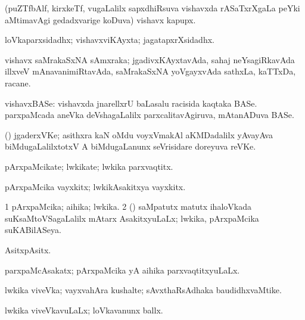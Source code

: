 {{{{{{\begin{center}
\bentry
{} 
\gl{\nA}
\expl{}
\bmng
(puZTfbAlf, kirxkeTf, \mo vugaLalilx sapxdhiRsuva vishavxda rASaTxrXgaLa peYki aMtimavAgi gedadxvarige koDuva) vishavx kapupx. 
\emng
\eentry

\bentry
{} 
\gl{\gu}
\expl{}
\bmng
loVkaparxsidadhx; vishavxviKAyxta; jagatapxrXsidadhx. 
\emng
\eentry

\bentry
{} 
\gl{\nA}
\expl{}
\bmng
vishavx saMrakaSxNA sAmxraka; jgadivxKAyxtavAda, sahaj neYsagiRkavAda illxveV mAnavanimiRtavAda, saMrakaSxNA yoVgayxvAda sathxLa, kaTTxDa, racane. 
\emng
\eentry

\bentry
{} 
\gl{\nA}
\expl{}
\bmng
vishavxBASe: 
\banum
{} vishavxda jnarellxrU baLasalu racisida kaqtaka BASe. 
 parxpaMcada aneVka deVshagaLalilx parxcalitavAgiruva, mAtanADuva BASe. 
\eanum
\emng
\eentry

\bentry
{} 
\gl{\nA}
\expl{}
\bmng
(\Bwvi) jgaderxVKe; asithxra kaN oMdu voyxVmakAl  aKMDadalilx yAvayAva biMdugaLalilxtotxV A biMdugaLanunx seVrisidare doreyuva reVKe. 
\emng
\eentry

\bentry
{} 
\gl{\nA}
\expl{}
\bmng
pArxpaMcikate; lwkikate; lwkika parxvaqtitx. 
\emng
\eentry

\bentry
{} 
\gl{\nA}
\expl{}
\bmng
pArxpaMcika vayxkitx; lwkikAsakitxya vayxkitx. 
\emng
\eentry

\bentry
{} 
\gl{\gu}
\bmng
\bnum
\num{1} pArxpaMcika; aihika; lwkika. 
\num{2} (\kanmu) saMpatutx matutx ihaloVkada suKsaMtoVSagaLalilx mAtarx AsakitxyuLaLx; lwkika, pArxpaMcika suKABilASeya. 
\enum
\emng

\noindent 
\gl{\pagu}
\expl{}
\bmng
{} AsitxpAsitx. 
\emng
\eentry

\bentry
{} 
\gl{\gu}
\expl{}
\bmng
parxpaMcAsakatx; pArxpaMcika yA aihika parxvaqtitxyuLaLx. 
\emng
\eentry

\bentry
{} 
\gl{\nA}
\expl{}
\bmng
lwkika viveVka; vayxvahAra kushalte; sAvxthaRsAdhaka baudidhxvaMtike. 
\emng
\eentry

\bentry
{} 
\gl{\gu}
\expl{}
\bmng
lwkika viveVkavuLaLx; loVkavanunx ballx. 
\emng
\eentry


\end{center}}}}}}}
